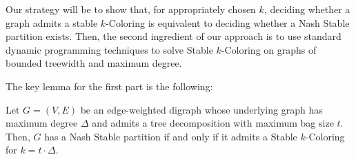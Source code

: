 \documentclass[letterpaper,USenglish,cleveref, autoref, thm-restate]{lipics-v2021}
\begin{document}
Our strategy will be to show that, for appropriately chosen $k$, deciding
whether a graph admits a stable $k$-Coloring is equivalent to deciding whether
a Nash Stable partition exists. Then, the second ingredient of our approach is
to use standard dynamic programming techniques to solve Stable $k$-Coloring on
graphs of bounded treewidth and maximum degree.

The key lemma for the first part is the following:

\begin{lemma}\label{lem:stable} Let $G=(V,E)$ be an edge-weighted digraph whose
underlying graph has maximum degree $\Delta$ and admits a tree decomposition
with maximum bag size $t$.  Then, $G$ has a Nash Stable partition if and only
if it admits a Stable $k$-Coloring for $k=t\cdot \Delta$.  \end{lemma}
\end{document}
